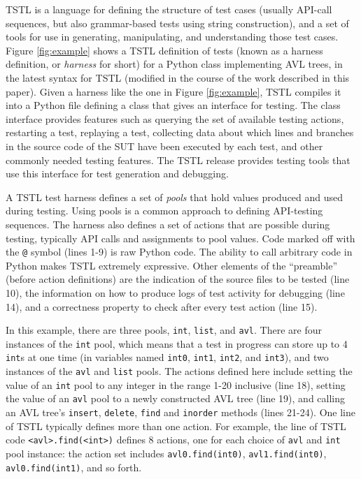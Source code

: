 TSTL \cite{NFM15,ISSTA15,tstl} is a language for defining the
structure of test cases (usually API-call sequences, but also
grammar-based tests using string construction), and a set of tools for
use in generating, manipulating, and understanding those test cases.
Figure \ref{fig:example} shows a TSTL definition of tests (known as a
harness definition, or \emph{harness} for short) for a Python class
implementing AVL trees, in the latest syntax for TSTL (modified in the
course of the work described in this paper).  Given a harness like the
one in Figure \ref{fig:example}, TSTL compiles it into a Python file
defining a class that gives an interface for testing.  The class
interface provides features such as
querying the set of available testing actions, restarting a test,
replaying a test, collecting data about which lines and branches in
the source code of the SUT have been executed by each test, and other commonly
needed testing features.  The TSTL release \cite{tstl} provides
testing tools that use this interface for test generation and
debugging.

A TSTL test harness defines a set of \emph{pools} that hold values
produced and used during testing.   Using pools \cite{AndrewsTR} is a common
approach to defining API-testing sequences.  The harness also defines a set of
actions that are possible during testing, typically API calls and
assignments to pool values.  Code marked off with the {\tt @}
symbol (lines 1-9) is raw Python code.  The ability to call
arbitrary code in Python makes TSTL extremely expressive.  Other
elements of the ``preamble'' (before action definitions) are the
indication of the source files to be tested (line 10), the information
on how to produce logs of test activity for debugging (line 14), and a
correctness property to check after every test action (line 15).

In this example, there are three pools,
{\tt int}, {\tt list}, and {\tt avl}.  There are four instances of the
{\tt int} pool, which means that a test in progress can store up to 4
{\tt int}s at one time (in variables named {\tt int0}, {\tt int1},
{\tt int2}, and {\tt int3}), and two instances of the {\tt avl} and
{\tt list}
pools.  The actions defined here include setting the value of an {\tt int}
pool to any integer in the range 1-20 inclusive (line 18), setting the value of
an {\tt avl} pool to a newly constructed AVL tree (line 19), and calling an AVL
tree's {\tt insert}, {\tt delete}, {\tt find} and {\tt inorder}
methods (lines 21-24).  One line of TSTL typically defines more than one action. For
example, the line of TSTL code {\tt <avl>.find(<int>)} defines 8 actions, one
for each choice of {\tt avl} and {\tt int} pool instance:  the action set
includes {\tt avl0.find(int0)}, {\tt avl1.find(int0)}, {\tt
  avl0.find(int1)}, and so forth.  


